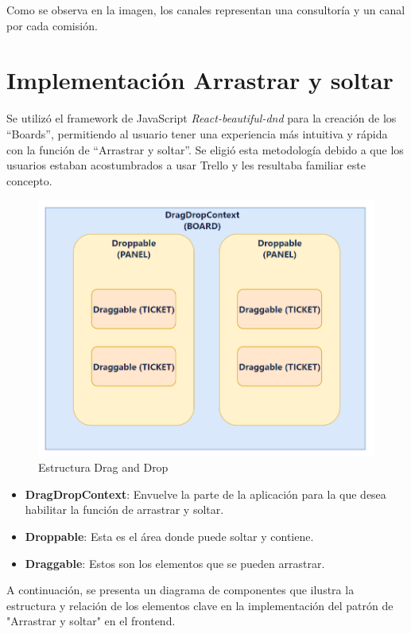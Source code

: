 Como se observa en la imagen, los canales representan una consultoría y un canal por cada comisión.


\section{Implementación Arrastrar y soltar}
Se utilizó el framework de JavaScript \textit{React-beautiful-dnd} para la creación de los ``Boards'', permitiendo al usuario tener una experiencia más intuitiva y rápida con la función de ``Arrastrar y soltar''. Se eligió esta metodología debido a que los usuarios estaban acostumbrados a usar Trello y les resultaba familiar este concepto.

\begin{figure}[H] \centering \includegraphics[width=1\linewidth]{fig/drag-drop.png} \caption{Estructura Drag and Drop} \label{fig:enter-label} \end{figure}

\begin{itemize}
    \item \textbf{DragDropContext}: Envuelve la parte de la aplicación para la que desea habilitar la función de arrastrar y soltar.
    \item \textbf{Droppable}: Esta es el área donde puede soltar y contiene.
    \item \textbf{Draggable}: Estos son los elementos que se pueden arrastrar.
\end{itemize}

A continuación, se presenta un diagrama de componentes que ilustra la estructura y relación de los elementos clave en la implementación del patrón de "Arrastrar y soltar" en el frontend.


